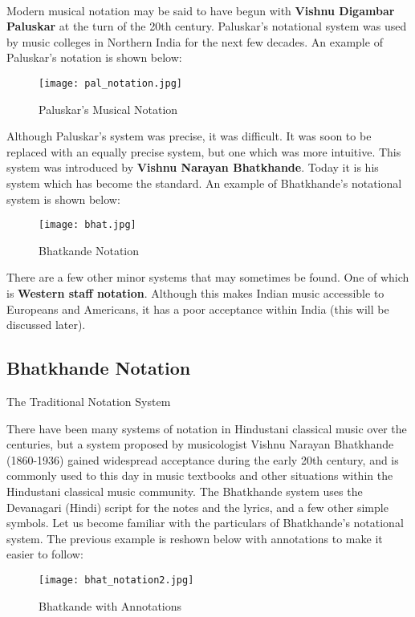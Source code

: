 \documentclass[12pt,a4paper]{article}
\begin{document}
\paragraph{}


Modern musical notation may be said to have begun with \textbf{Vishnu Digambar Paluskar} at the turn of the 20th century.  Paluskar's notational system was used by music colleges in Northern India for the next few decades.  An example of Paluskar's notation is shown below:

\begin{figure}[ht]
\centering
\texttt{[image: pal\_notation.jpg]}
\caption{Paluskar's Musical Notation}
\label{fig:beta}
\end{figure}


Although Paluskar's system was precise, it was difficult.  It was soon to be replaced with an equally precise system, but one which was more intuitive. This system was introduced by \textbf{Vishnu Narayan Bhatkhande}.  Today it is his system which has become the standard.  An example of Bhatkhande's notational system is shown below:

\begin{figure}[ht]
\centering
\texttt{[image: bhat.jpg]}
\caption{Bhatkande Notation}
\label{fig:beta}
\end{figure}


There are a few other minor systems that may sometimes be found.  One of which is \textbf{Western staff notation}.  Although this makes Indian music accessible to Europeans and Americans, it has a poor acceptance within India (this will be discussed later).  


\subsection{Bhatkhande Notation}

The Traditional Notation System

There have been many systems of notation in Hindustani classical music over the centuries, but a system proposed by musicologist Vishnu Narayan Bhatkhande (1860-1936) gained widespread acceptance during the early 20th century, and is commonly used to this day in music textbooks and other situations within the Hindustani classical music community. The Bhatkhande system uses the Devanagari (Hindi) script for the notes and the lyrics, and a few other simple symbols.
Let us become familiar with the particulars of Bhatkhande's notational system.  The previous example is reshown below with annotations to make it easier to follow:
\begin{figure}[ht]
\centering
\texttt{[image: bhat\_notation2.jpg]}
\caption{Bhatkande with Annotations}
\label{fig:beta}
\end{figure}
\end{document}
